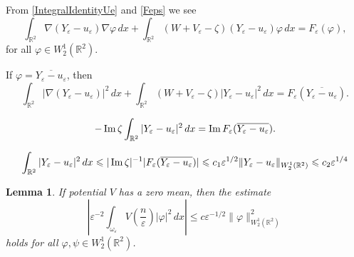 \documentclass[reqno]{amsart}
\theoremstyle{plain}
\newtheorem{lem}{Lemma}
\numberwithin{equation}{section}
\renewcommand{\Im}{\mathop{\rm Im}}
\newcommand{\Real}{\mathbb R}
\newcommand{\eps}{\varepsilon}
\renewcommand{\phi}{\varphi}
\renewcommand{\leq}{\leqslant}
\newcommand\nep{\textstyle\frac n\eps}
\begin{document}
From \eqref{IntegralIdentityUe} and  \eqref{Feps} we see
\begin{equation*}
\int_{\Real^2}\nabla (Y_\eps-u_\eps) \nabla \phi\,dx+
             \int_{\Real^2} (W+V_\eps-\zeta)(Y_\eps-u_\eps) \phi\,dx=F_\eps(\phi),
\end{equation*}
for all $\phi\in W_2^1(\Real^2)$.





If $\phi=\overline{Y_\eps-u_\eps}$, then
\begin{equation*}
\int_{\Real^2}|\nabla (Y_\eps-u_\eps)|^2\,dx+
             \int_{\Real^2} (W+V_\eps-\zeta)|Y_\eps-u_\eps|^2\,dx
             =F_\eps(\overline{Y_\eps-u_\eps}).
\end{equation*}


\begin{equation*}
-\Im \zeta \int_{\Real^2}|Y_\eps-u_\eps|^2\,dx=\Im F_\eps(\overline{Y_\eps-u_\eps}).
\end{equation*}


\begin{equation*}
 \int_{\Real^2}|Y_\eps-u_\eps|^2\,dx\leq |\Im \zeta|^{-1} |F_\eps(\overline{Y_\eps-u_\eps})|\leq c_1\eps^{1/2}\|Y_\eps-u_\eps\|_{W_2^1(\Real^2)}\leq c_2\eps^{1/4}
\end{equation*}


\begin{lem}
If potential $V$ has a zero mean, then the estimate
 \begin{equation*}
  \left|\eps^{-2}\int_{\omega_\eps}V(\nep)|\phi|^2 \,dx\right|\leq c\eps^{-1/2}\|\phi\|_{W_2^1(\Real^2)}^2
 \end{equation*}
holds for all $\phi, \psi \in W_2^1(\Real^2)$.
\end{lem}
\end{document}
